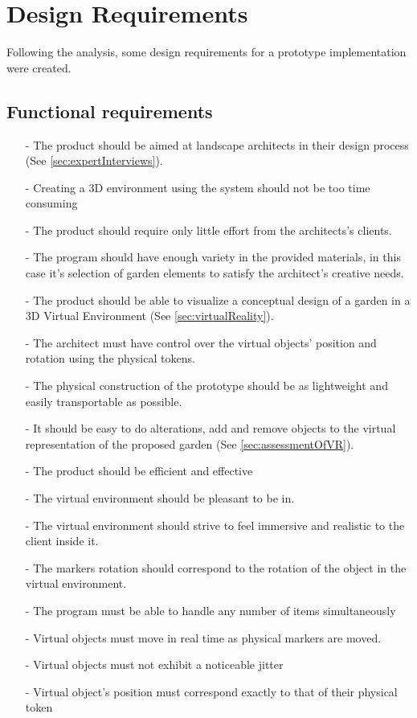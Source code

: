 			\section{Design Requirements}\label{sec:designRequirements}
			Following the analysis, some design requirements for a prototype implementation were created.
				\subsection{Functional requirements}
					\begin{itemize}
						\item[-] The product should be aimed at landscape architects in their design process (See \autoref{sec:expertInterviews}).
						\item[-] Creating a 3D environment using the system should not be too time consuming
						\item[-] The product should require only little effort from the architects's clients.
						\item[-] The program should have enough variety in the provided materials, in this case it's selection of garden elements to satisfy the architect's creative needs.
						\item[-] The product should be able to visualize a conceptual design of a garden in a 3D Virtual Environment (See \autoref{sec:virtualReality}).
						\item[-] The architect must have control over the virtual objects' position and rotation using the physical tokens.
						
						\item[-] The physical construction of the prototype should be as lightweight and easily transportable as possible.
						
						\item[-] It should be easy to do alterations, add and remove objects to the virtual representation of the proposed garden (See \autoref{sec:assessmentOfVR}).
						\item[-] The product should be efficient and effective
						\item[-] The virtual environment should be pleasant to be in.
						\item[-] The virtual environment should strive to feel immersive and realistic to the client inside it.
						
						\item[-] The markers rotation should correspond to the rotation of the object in the virtual environment.
						\item[-] The program must be able to handle any number of items simultaneously
						\item[-] Virtual objects must move in real time as physical markers are moved.
						\item[-] Virtual objects must not exhibit a noticeable jitter
						\item[-] Virtual object's position must correspond exactly to that of their physical token
					\end{itemize}
					
